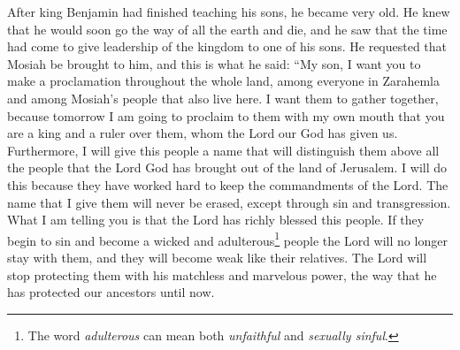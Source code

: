 After king Benjamin had finished teaching his sons, he became very old. He knew that he would soon go the way of all the earth and die, and he saw that the time had come to give leadership of the kingdom to one of his sons.
\bverse \iffalse Therefore, he had Mosiah brought before him; and these are the words which he spake unto him, saying: My son, I would that ye should make a proclamation throughout all this land among all this people, or the people of Zarahemla, and the people of Mosiah who dwell in the land, that thereby they may be gathered together; for on the morrow I shall proclaim unto this my people out of mine own mouth that thou art a king and a ruler over this people, whom the Lord our God hath given us. \fi
He requested that Mosiah be brought to him, and this is what he said: ``My son, I want you to make a proclamation throughout the whole land, among everyone in Zarahemla and among Mosiah's people that also live here. I want them to gather together, because tomorrow I am going to proclaim to them with my own mouth that you are a king and a ruler over them, whom the Lord our God has given us.
\bverse \iffalse And moreover, I will give this people a name, that thereby they may be distinguished above all the people which the Lord God hath brought out of the land of Jerusalem; and this I do because they have been a diligent people in keeping the commandments of the Lord. \fi
Furthermore, I will give this people a name that will distinguish them above all the people that the Lord God has brought out of the land of Jerusalem. I will do this because they have worked hard to keep the commandments of the Lord.
\bverse \iffalse And I give unto them a name that never shall be blotted out, except it be through transgression. \fi
The name that I give them will never be erased, except through sin and transgression.
\bverse \iffalse Yea, and moreover I say unto you, that if this highly favored people of the Lord should fall into transgression, and become a wicked and an adulterous people, that the Lord will deliver them up, that thereby they become weak like unto their brethren; and he will no more preserve them by his matchless and marvelous power, as he has hitherto preserved our fathers. \fi
What I am telling you is that the Lord has richly blessed this people. If they begin to sin and become a wicked and adulterous\footnote{The word \textit{adulterous} can mean both \textit{unfaithful} and \textit{sexually sinful}.} people the Lord will no longer stay with them, and they will become weak like their relatives. The Lord will stop protecting them with his matchless and marvelous power, the way that he has protected our ancestors until now.
